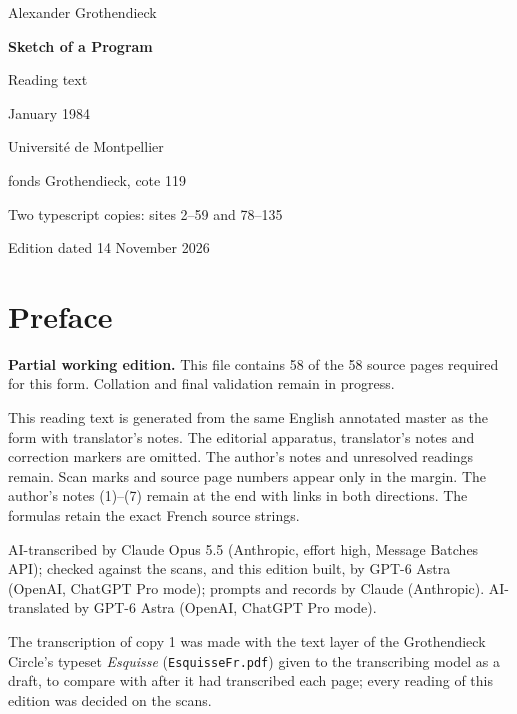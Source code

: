 \documentclass[11pt,a4paper]{article}
\newcommand{\EditionTitle}{Sketch of a Program}
\newcommand{\EditionForm}{Reading text}
\begin{document}
\begin{titlepage}
\centering
\vspace*{18mm}
{\Large Alexander Grothendieck\par}
\vspace{12mm}
{\Huge\bfseries\EditionTitle\par}
\vspace{8mm}
{\Large\EditionForm\par}
\vspace{14mm}
{\large January 1984\par}
\vfill
{\large Université de Montpellier\par fonds Grothendieck, cote 119\par}
\vspace{8mm}
{\normalsize Two typescript copies: sites 2--59 and 78--135\par}
\vspace{8mm}
{\normalsize Edition dated 14 November 2026\par}
\end{titlepage}
\thispagestyle{plain}
\section*{Preface}
\noindent\textbf{Partial working edition.} This file contains 58 of the 58 source pages required for this form. Collation and final validation remain in progress.\par\smallskip
This reading text is generated from the same English annotated master as the form with translator’s notes. The editorial apparatus, translator’s notes and correction markers are omitted. The author’s notes and unresolved readings remain. Scan marks and source page numbers appear only in the margin. The author’s notes (1)–(7) remain at the end with links in both directions. The formulas retain the exact French source strings.

\smallskip
AI-transcribed by Claude Opus 5.5 (Anthropic, effort high, Message Batches API); checked against the scans, and this edition built, by GPT-6 Astra (OpenAI, ChatGPT Pro mode); prompts and records by Claude (Anthropic).
AI-translated by GPT-6 Astra (OpenAI, ChatGPT Pro mode).

The transcription of copy 1 was made with the text layer of the Grothendieck Circle's typeset \textit{Esquisse} (\texttt{EsquisseFr.pdf}) given to the transcribing model as a draft, to compare with after it had transcribed each page; every reading of this edition was decided on the scans.
\end{document}
